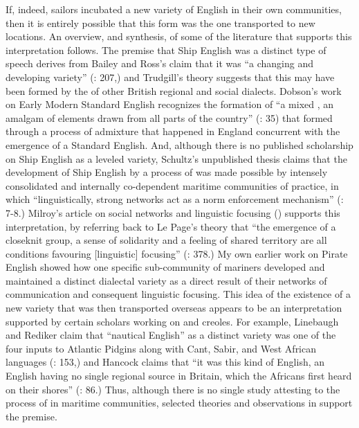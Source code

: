 If, indeed, sailors incubated a new variety of English in their own communities, then it is entirely possible that this form was the one transported to new locations. An overview, and synthesis, of some of the literature that supports this interpretation follows. The premise that Ship English was a distinct type of speech derives from Bailey and Ross’s claim that it was “a changing and developing variety” (: 207,) and Trudgill’s theory suggests that this may have been formed by the  of other British regional and social dialects. Dobson’s work on Early Modern Standard English recognizes the formation of “a mixed , an amalgam of elements drawn from all parts of the country” (: 35) that formed through a process of admixture that happened in England concurrent with the emergence of a Standard English. And, although there is no published scholarship on Ship English as a leveled variety, Schultz’s unpublished thesis claims that the development of Ship English by a process of   was made possible by intensely consolidated and internally co-dependent maritime communities of practice, in which “linguistically, strong networks act as a norm enforcement mechanism” (\citeyear{Schultz2010}: 7-8.) Milroy’s article on social networks and linguistic focusing (\citeyear*{Milroy1986}) supports this interpretation, by referring back to Le Page’s theory that “the emergence of a closeknit group, a sense of solidarity and a feeling of shared territory are all conditions favouring [linguistic] focusing” (\citeyear*{Milroy1986}: 378.) My own earlier work on Pirate English \citep{Delgado2013} showed how one specific sub-community of mariners developed and maintained a distinct dialectal variety as a direct result of their networks of communication and consequent linguistic focusing. This idea of the existence of a new variety that was then transported overseas appears to be an interpretation supported by certain scholars working on  and creoles.  For example, Linebaugh and Rediker claim that “nautical English” as a distinct variety was one of the four inputs to Atlantic Pidgins along with Cant, Sabir, and West African languages (\citeyear{LinebaughRediker2000}: 153,) and Hancock claims that “it was this kind of English, an English having no single regional source in Britain, which the Africans first heard on their shores” (\citeyear*{Haddock1986}: 86.) Thus, although there is no single study attesting to the process of  in maritime communities, selected theories and observations in  support the premise. 

